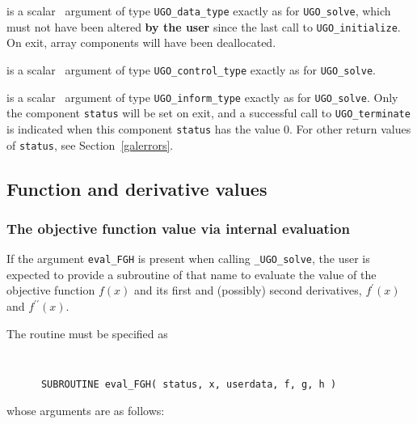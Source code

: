 \documentclass{galahad}
\newcommand{\packagename}{UGO}
\newcommand{\fullpackagename}{\libraryname\_\packagename}
\newcommand{\solver}{{\tt \fullpackagename\_solve}}
\begin{document}
\vspace*{-1mm}
\begin{description}

 is a scalar \intentinout\ argument of type
{\tt \packagename\_data\_type}
exactly as for
{\tt \packagename\_solve},
which must not have been altered {\bf by the user} since the last call to
{\tt \packagename\_initialize}.
On exit, array components will have been deallocated.

 is a scalar \intentin\ argument of type
{\tt \packagename\_control\_type}
exactly as for
{\tt \packagename\_solve}.

 is a scalar \intentout\ argument of type
{\tt \packagename\_inform\_type}
exactly as for
{\tt \packagename\_solve}.
Only the component {\tt status} will be set on exit, and a
successful call to
{\tt \packagename\_terminate}
is indicated when this  component {\tt status} has the value 0.
For other return values of {\tt status}, see Section~\ref{galerrors}.

\end{description}


\subsection{Function and derivative values\label{fdv}}


\subsubsection{The objective function value via internal evaluation\label{fghfv}}

If the argument {\tt eval\_FGH} is present when calling \solver, the
user is expected to provide a subroutine of that name to evaluate the
value of the objective function $f(x)$ and its first and (possibly) 
second derivatives, $f^{\prime}(x)$ and $f^{\prime\prime}(x)$.

The routine must be specified as

\def\baselinestretch{0.8}
{\tt
\begin{verbatim}
      SUBROUTINE eval_FGH( status, x, userdata, f, g, h )
\end{verbatim}
}
\def\baselinestretch{1.0}
\noindent whose arguments are as follows:
\end{document}

